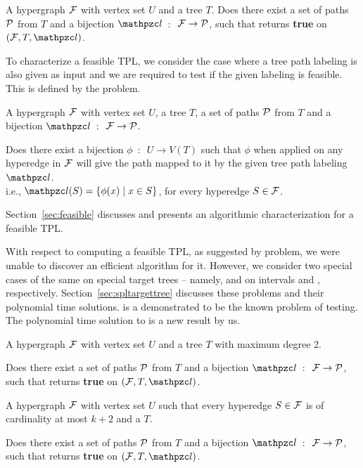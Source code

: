 \begin{problemdef}{\CFTPL}{A hypergraph ${\cal F}$ with vertex set $U$ and
    a tree $T$.}
  Does there exist a set of paths ${\cal P}$ from $T$ and a bijection
  $\cl$~$:$~${\cal F} \rightarrow {\cal P}$, such that {\FTPL} returns {\bf
    true} on $(\cF, T, \cl)$.
\end{problemdef}

To characterize a feasible TPL, we consider the case where a tree path
labeling is also given as input and we are required to test if the
given labeling is feasible. This is defined by the \FTPL problem.

\begin{problemdef}{\FTPL}{A hypergraph ${\cal F}$ with vertex set $U$, a
    tree $T$, a set of paths ${\cal P}$ from $T$ and a bijection
    $\cl$~$:$~${\cal F} \rightarrow {\cal P}$.}

  Does there exist a bijection $\phi$~$:$~$U \rightarrow V(T)$ such
  that $\phi$ when applied on any hyperedge in ${\cal F}$ will give
  the path mapped to it by the given tree path labeling $\cl$.\\
  { i.e., $\cl(S) = \{\phi(x) \mid x \in S\}$, for every hyperedge $S
    \in {\cal F}$.}
\end{problemdef}

Section~\ref{sec:feasible} discusses \FTPL and presents an algorithmic
characterization for a feasible TPL.

With respect to computing a feasible TPL, as suggested by \CFTPL
problem, we were unable to discover an efficient algorithm for
it. However, we consider two special cases of the same on special
target trees -- namely, \CFTPLINT and \CFTPLKTREE on intervals and
\kstars, respectively.  Section~\ref{sec:spltargettree} discusses
these problems and their polynomial time solutions.  \CFTPLINT is a
demonstrated to be the known problem of \COP testing. The polynomial
time solution to \CFTPLKTREE is a new result by us.

\begin{problemdef}{\CFTPLINT}{ A hypergraph ${\cal F}$ with vertex set $U$
    and a tree $T$ with maximum degree 2.}

  Does there exist a set of paths ${\cal P}$ from $T$ and a bijection
  $\cl$~$:$~${\cal F} \rightarrow {\cal P}$, such that {\FTPL} returns {\bf
    true} on $(\cF, T, \cl)$.  
\end{problemdef}

\begin{problemdef}{\CFTPLKTREE}{A hypergraph ${\cal F}$ with vertex set $U$
    such that every hyperedge $S \in {\cal F}$ is of cardinality at most
    $k+2$ and a {\kstar} $T$.}

  Does there exist a set of paths ${\cal P}$ from $T$ and a bijection
  $\cl$~$:$~${\cal F} \rightarrow {\cal P}$, such that {\FTPL} returns {\bf
    true} on $(\cF, T, \cl)$.
\end{problemdef}

